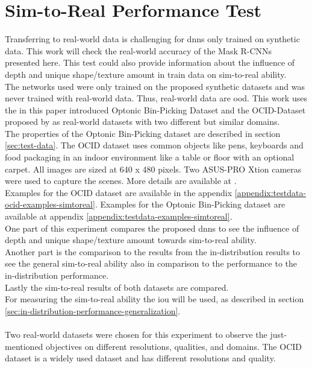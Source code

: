 	\section{Sim-to-Real Performance Test}
	\label{sec:simt-to-real-performance-test}
		Transferring to real-world data is challenging for \ac{dnn}s only trained on synthetic data. This work will check the real-world accuracy of the Mask R-CNNs presented here. This test could also provide information about the influence of depth and unique shape/texture amount in train data on sim-to-real ability.\\
		The networks used were only trained on the proposed synthetic datasets and was never trained with real-world data. Thus, real-world data are \acl{ood}. This work uses the in this paper introduced Optonic Bin-Picking Dataset and the OCID-Dataset proposed by \citeauthor{Suchi2019} as real-world datasets with two different but similar domains. \\
		The properties of the Optonic Bin-Picking dataset are described in section \ref{sec:test-data}. The OCID dataset uses common objects like pens, keyboards and food packaging in an indoor environment like a table or floor with an optional carpet. All images are sized at 640 x 480 pixels. Two ASUS-PRO Xtion cameras were used to capture the scenes. More details are available at .\\
		Examples for the OCID dataset are available in the appendix \ref{appendix:testdata-ocid-examples-simtoreal}. Examples for the Optonic Bin-Picking dataset are available at appendix \ref{appendix:testdata-examples-simtoreal}.
		\\
		One part of this experiment compares the proposed \ac{dnn}s to see the influence of depth and unique shape/texture amount towards sim-to-real ability.\\
		Another part is the comparison to the results from the in-distribution results to see the general sim-to-real ability also in comparison to the performance to the in-distribution performance.\\
		Lastly the sim-to-real results of both datasets are compared.\\
		For measuring the sim-to-real ability the \ac{iou} will be used, as described in section \ref{sec:in-distribution-performance-generalization}.\\
		\\
		Two real-world datasets were chosen for this experiment to observe the just-mentioned objectives on different resolutions, qualities, and domains. The OCID dataset is a widely used dataset \cite{Xiang2021} and has different resolutions and quality.
	
	
	
	
	
	
	
	
	


